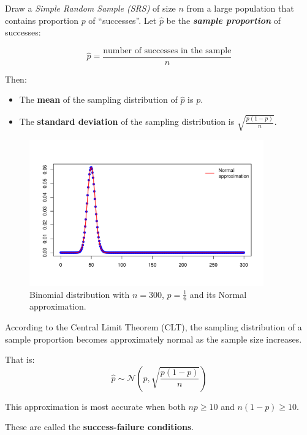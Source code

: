 Draw a \textit{Simple Random Sample (SRS)} of size \( n \) from a large population that contains proportion \( p \) of “successes”. Let \( \hat{p} \) be the \textbf{\textit{sample proportion}} of successes:

\[
\hat{p} = \frac{\text{number of successes in the sample}}{n}
\]

Then:

\begin{itemize}
  \item The \textbf{mean} of the sampling distribution of \( \hat{p} \) is \( p \).
  \item The \textbf{standard deviation} of the sampling distribution is \( \sqrt{ \frac{p(1 - p)}{n} } \).
\end{itemize}


\begin{figure}[h!]
  \centering
  \includegraphics[width=0.9\textwidth]{Section4/images/binomial_normal.pdf}
  \vspace{-10pt} %
  \captionsetup{skip=0pt} %
  \caption{Binomial distribution with \(n = 300\), \(p = \frac{1}{6}\) and its Normal approximation.}
\end{figure}


According to the Central Limit Theorem (CLT), the sampling distribution of a sample proportion becomes approximately normal as the sample size increases.

That is:
\[
\hat{p} \sim \mathcal{N}\left(p, \sqrt{\frac{p(1 - p)}{n}}\right)
\]

This approximation is most accurate when both \( np \geq 10 \) and \( n(1 - p) \geq 10 \).

These are called the \textbf{success-failure conditions}.

